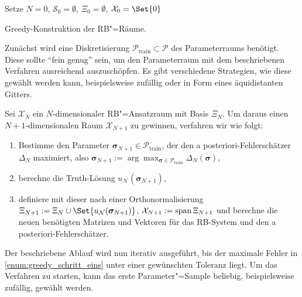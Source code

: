 \documentclass[../main.tex]{subfiles}
\begin{document}
\begin{algorithm}[tb]
    \BlankLine
    Setze $N = 0$, $\mathcal S_{0} = \emptyset$, $\Xi_{0} = \emptyset$, $\mathcal X_{0} = \Set{0}$\;
    \caption{Greedy-Konstruktion der RB"=Räume.}
    \label{algorithm:greedy_training}
\end{algorithm}

Zunächst wird eine Diskretisierung $\mathcal P_{\mathrm{train}} \subset \mathcal P$ des Parameterraums benötigt.
Diese sollte \enquote{fein genug} sein, um den Parameterraum mit dem beschriebenen Verfahren ausreichend auszuschöpfen.
Es gibt verschiedene Strategien, wie diese gewählt werden kann, beispielsweise zufällig oder in Form eines äquidistanten Gitters.

Sei $\mathcal X_{N}$ ein $N$-dimensionaler RB"=Ansatzraum mit Basis $\Xi_{N}$.
Um daraus einen $N+1$-dimensionalen Raum $\mathcal X_{N + 1}$ zu gewinnen, verfahren wir wie folgt:
\begin{enumerate}[label={\itshape\roman*.},ref={\itshape\roman*}]
    \item\label{enum:greedy_schritt_eins} Bestimme den Parameter $\bm \sigma_{N+1} \in \mathcal P_{\mathrm{train}}$, der den a posteriori-Fehlerschätzer $\Delta_{N}$ maximiert, also $\bm \sigma_{N+1} := \arg \max_{\bm \sigma \in \mathcal P_{\mathrm{train}}} \Delta_{N}(\bm \sigma)$,
    \item berechne die Truth-Lösung $u_{\mathcal N}(\bm \sigma_{N+1})$,
    \item definiere mit dieser nach einer Orthonormalisierung $\Xi_{N + 1} := \Xi_{N} \cup \Set{u_{\mathcal N}(\bm \sigma_{N+1})}$, $\mathcal X_{N + 1} := \operatorname{span} \Xi_{N + 1}$ und berechne die neuen benötigten Matrizen und Vektoren für das RB-System und den a posteriori-Fehlerschätzer.
\end{enumerate}
Der beschriebene Ablauf wird nun iterativ ausgeführt, bis der maximale Fehler in \cref{enum:greedy_schritt_eins} unter einer gewünschten Toleranz liegt.
Um das Verfahren zu starten, kann das erste Parameter"=Sample beliebig, beispielsweise zufällig, gewählt werden.
\end{document}
